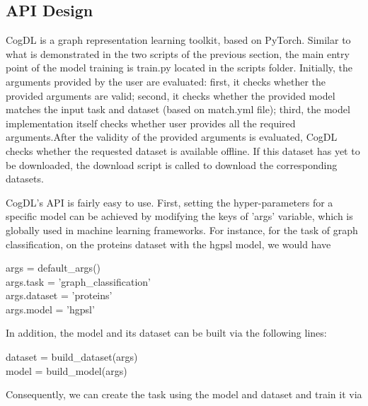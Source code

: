 \documentclass[12pt,a4paper]{article}
\begin{document}
	\subsection{API Design}
	\noindent CogDL is a graph representation learning toolkit, based on PyTorch. Similar to what is demonstrated in the two scripts of the previous section, the main entry point of the model training is train.py located in the scripts folder. Initially, the arguments provided by the user are evaluated: first, it checks whether the provided arguments are valid; second, it checks whether the provided model matches the input task and dataset (based on match.yml file); third, the model implementation itself checks whether user provides all the required arguments.After the validity of the provided arguments is evaluated, CogDL checks whether the requested dataset is available offline. If this dataset has yet to be downloaded, the download script is called to download the corresponding datasets.
	
	\vspace{0.1cm}
	\noindent CogDL's API is fairly easy to use. First, setting the hyper-parameters for a specific model can be achieved by modifying the keys of 'args' variable, which is globally used in machine learning frameworks. For instance, for the task of graph classification, on the proteins dataset with the hgpsl model, we would have
	
	\vspace{-0.3cm}
	\begin{center}
		args = default\_args()\\
		args.task = 'graph\_classification'\\
		args.dataset = 'proteins'\\
		args.model = 'hgpsl'
	\end{center}

	\vspace{-0.2cm}
	\noindent In addition, the model and its dataset can be built via the following lines:
	
	\vspace{-0.2cm}
	\begin{center}
		dataset = build\_dataset(args)\\
		model = build\_model(args)\\
	\end{center}

	\vspace{-0.2cm}
	\noindent Consequently, we can create the task using the model and dataset and train it via
	
\end{document}
